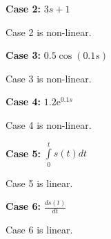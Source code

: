 \textbf{Case 2:} $3s + 1$

Case 2 is non-linear.

\vspace*{1cm}

\textbf{Case 3:} $0.5 \cos (0.1 s) $

Case 3 is non-linear.

\vspace*{1cm}

\textbf{Case 4:} $1.2 \mathrm{e}^{0.1 s}$

Case 4 is non-linear.

\vspace*{1cm}

\textbf{Case 5:} $\int\limits_0^t s(t)dt$

Case 5 is linear.

\vspace*{1cm}

\textbf{Case 6:} $\frac{ds(t)}{dt}$

Case 6 is linear.

\vspace*{1cm}
